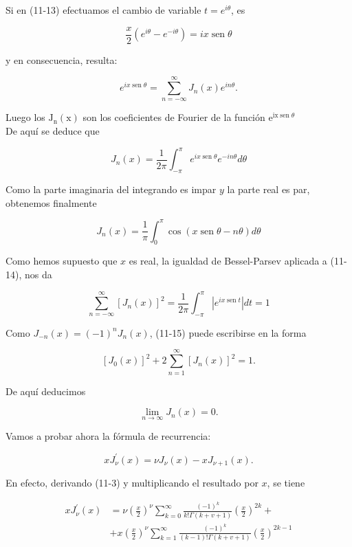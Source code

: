 \documentclass[10pt]{article}
\theoremstyle{plain}
\theoremstyle{definition}
\theoremstyle{remark}
\begin{document}
Si en (11-13) efectuamos el cambio de variable $t=e^{i \theta}$, es

$$
\frac{x}{2}\left(e^{i \theta}-e^{-i \theta}\right)=i x \operatorname{sen} \theta
$$

y en consecuencia, resulta:


\begin{equation*}
e^{i x \operatorname{sen} \theta}=\sum_{n=-\infty}^{\infty} J_{n}(x) e^{i n \theta} . \tag{11-14}
\end{equation*}


Luego los $\mathrm{J}_{\mathrm{n}}(\mathrm{x})$ son los coeficientes de Fourier de la función $\mathrm{e}^{\mathrm{ix} \operatorname{sen} \theta}$\\
De aquí se deduce que

$$
J_{n}(x)=\frac{1}{2 \pi} \int_{-\pi}^{\pi} e^{i x \operatorname{sen} \theta} e^{-i n \theta} d \theta
$$

Como la parte imaginaria del integrando es impar $y$ la parte real es par, obtenemos finalmente

$$
J_{n}(x)=\frac{1}{\pi} \int_{0}^{\pi} \cos (x \operatorname{sen} \theta-n \theta) d \theta
$$


Como hemos supuesto que $x$ es real, la igualdad de Bessel-Parsev aplicada a (11-14), nos da


\begin{equation*}
\sum_{n=-\infty}^{\infty}\left[J_{n}(x)\right]^{2}=\frac{1}{2 \pi} \int_{-\pi}^{\pi}\left|e^{i x \operatorname{sen} t}\right| d t=1 \tag{$(11.15$}
\end{equation*}


Como $J_{-n}(x)=(-1)^{n} J_{n}(x)$, (11-15) puede escribirse en la forma

$$
\left[J_{0}(x)\right]^{2}+2 \sum_{n=1}^{\infty}\left[J_{n}(x)\right]^{2}=1 .
$$

De aquí deducimos

$$
\lim _{n \rightarrow \infty} J_{n}(x)=0 .
$$

Vamos a probar ahora la fórmula de recurrencia:


\begin{equation*}
x J_{\nu}^{\prime}(x)=\nu J_{\nu}(x)-x J_{\nu+1}(x) . \tag{11-16}
\end{equation*}


En efecto, derivando (11-3) y multiplicando el resultado por $x$, se tiene

$$
\begin{aligned}
x J_{\nu}^{\prime}(x) & =\nu\left(\frac{x}{2}\right)^{\nu} \sum_{k=0}^{\infty} \frac{(-1)^{k}}{k!\Gamma(k+v+1)}\left(\frac{x}{2}\right)^{2 k}+ \\
& +x\left(\frac{x}{2}\right)^{\nu} \sum_{k=1}^{\infty} \frac{(-1)^{k}}{(k-1)!\Gamma(k+v+1)}\left(\frac{x}{2}\right)^{2 k-1}
\end{aligned}
$$
\end{document}
